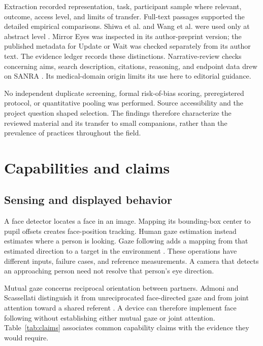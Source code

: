 \documentclass[journal]{IEEEtran}
\begin{document}
Extraction recorded representation, task, participant sample where relevant, outcome, access level, and limits of transfer. Full-text passages supported the detailed empirical comparisons. Shiwa et al. and Wang et al. were used only at abstract level \cite{shiwa2009,wang2026}. Mirror Eyes was inspected in its author-preprint version; the published metadata for Update or Wait was checked separately from its author text. The evidence ledger records these distinctions. Narrative-review checks concerning aims, search description, citations, reasoning, and endpoint data drew on SANRA \cite{sanra2019}. Its medical-domain origin limits its use here to editorial guidance.

No independent duplicate screening, formal risk-of-bias scoring, preregistered protocol, or quantitative pooling was performed. Source accessibility and the project question shaped selection. The findings therefore characterize the reviewed material and its transfer to small companions, rather than the prevalence of practices throughout the field.

\section{Capabilities and claims}
\subsection{Sensing and displayed behavior}
A face detector locates a face in an image. Mapping its bounding-box center to pupil offsets creates face-position tracking. Human gaze estimation instead estimates where a person is looking. Gaze following adds a mapping from that estimated direction to a target in the environment \cite{neuber2026}. These operations have different inputs, failure cases, and reference measurements. A camera that detects an approaching person need not resolve that person's eye direction.

Mutual gaze concerns reciprocal orientation between partners. Admoni and Scassellati distinguish it from unreciprocated face-directed gaze and from joint attention toward a shared referent \cite{admoni2017}. A device can therefore implement face following without establishing either mutual gaze or joint attention. Table~\ref{tab:claims} associates common capability claims with the evidence they would require.
\end{document}
